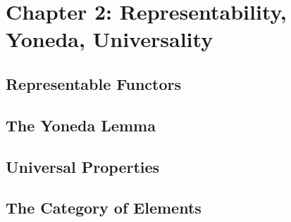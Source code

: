 \section{Chapter 2: Representability, Yoneda, Universality}

\subsection{Representable Functors}

\subsection{The Yoneda Lemma}

\subsection{Universal Properties}

\subsection{The Category of Elements}